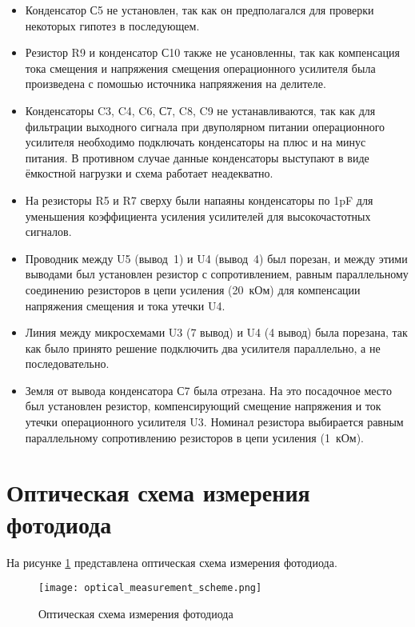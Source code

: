 \begin{itemize}
    \item Конденсатор С5 не установлен, так как он предполагался 
    для проверки некоторых гипотез в последующем.
    \item Резистор R9 и конденсатор С10 также не усановленны, 
    так как компенсация тока смещения и напряжения смещения 
    операционного усилителя была произведена с помошью источника 
    напряяжения на делителе.
    \item Конденсаторы C3, C4, C6, С7, C8, C9 не устанавливаются, 
    так как для фильтрации выходного сигнала при двуполярном
    питании операционного усилителя необходимо подключать 
    конденсаторы на плюс и на минус питания. В противном случае 
    данные конденсаторы выступают в виде ёмкостной нагрузки 
    и схема работает неадекватно.
    \item На резисторы R5 и R7 сверху были напаяны конденсаторы 
    по 1pF для уменьшения коэффициента усиления усилителей 
    для высокочастотных сигналов.
    \item Проводник между U5 (вывод~1) и U4 (вывод~4) был порезан, 
    и между этими выводами был установлен резистор с сопротивлением,
    равным параллельному соединению резисторов в цепи усиления (20~кОм) 
    для компенсации напряжения смещения и тока утечки U4.
    \item Линия между микросхемами U3 (7 вывод) и U4 (4 вывод) 
    была порезана, так как было принято решение подключить 
    два усилителя параллельно, а не последовательно.
    \item Земля от вывода конденсатора С7 была отрезана. 
    На это посадочное место был установлен резистор, 
    компенсирующий смещение напряжения и ток утечки 
    операционного усилителя U3. Номинал резистора выбирается 
    равным параллельному сопротивлению резисторов 
    в цепи усиления (1~кОм).
\end{itemize}

\section*{Оптическая схема измерения фотодиода}
На рисунке \ref{fig:optical_measurement_scheme} представлена
оптическая схема измерения фотодиода.
\begin{figure}[h]
    \centering
    \texttt{[image: optical\_measurement\_scheme.png]}
    \caption{Оптическая схема измерения фотодиода}
    \label{fig:optical_measurement_scheme}
\end{figure}

